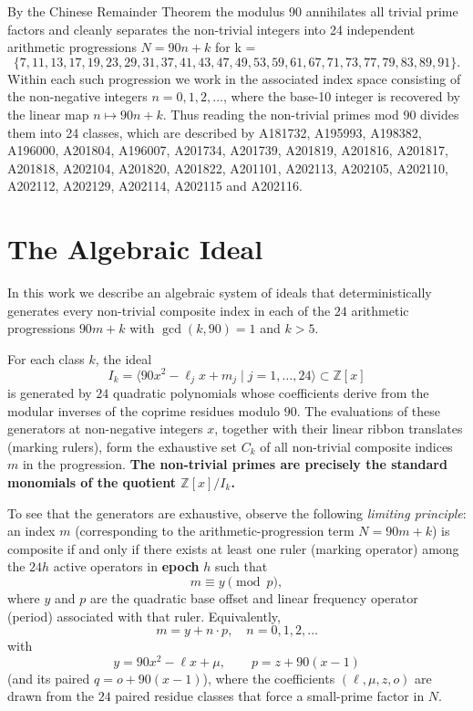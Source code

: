 \documentclass[11pt,a4paper]{article}
\begin{document}
By the Chinese Remainder Theorem the modulus 90 annihilates all trivial prime factors and cleanly separates the non-trivial integers into 24 independent arithmetic progressions \(N=90n+k\) for k = 
\[
\{7,11,13,17,19,23,29,31,37,41,43,47,49,53,59,61,67,71,73,77,79,83,89,91\}.
\]
Within each such progression we work in the associated index space consisting of the non-negative integers \(n=0,1,2,\dots\), where the base-10 integer is recovered by the linear map \(n\mapsto90n+k\). Thus reading the non-trivial primes mod 90 divides them into 24 classes, which are described by A181732, A195993,
A198382, A196000, A201804, A196007, A201734, A201739, A201819, A201816,
A201817, A201818, A202104, A201820, A201822, A201101, A202113, A202105,
A202110, A202112, A202129, A202114, A202115 and A202116. 




\section{The Algebraic Ideal}

In this work we describe an algebraic system of ideals that deterministically generates every non-trivial composite index in each of the $24$ arithmetic progressions $90m+k$ with $\gcd(k,90)=1$ and $k>5$.

For each class $k$, the ideal
\[
I_k=\langle 90x^2-\ell_j x+m_j\mid j=1,\dots,24\rangle\subset\mathbb{Z}[x]
\]
is generated by $24$ quadratic polynomials whose coefficients derive from the modular inverses of the coprime residues modulo $90$. The evaluations of these generators at non-negative integers $x$, together with their linear ribbon translates (marking rulers), form the exhaustive set $C_k$ of all non-trivial composite indices $m$ in the progression.\textbf{ The non-trivial primes are precisely the standard monomials of the quotient $\mathbb{Z}[x]/I_k$. }

To see that the generators are exhaustive, observe the following \emph{limiting principle}: an index $m$ (corresponding to the arithmetic-progression term $N=90m+k$) is composite if and only if there exists at least one ruler (marking operator) among the $24h$ active operators in \textbf{epoch} $h$ such that
\[
m \equiv y \pmod{p},
\]
where $y$ and $p$ are the quadratic base offset and linear frequency operator (period) associated with that ruler. Equivalently,
\[
m = y + n\cdot p, \quad n=0,1,2,\dots
\]
with
\[
y = 90x^2 - \ell x + \mu, \qquad p = z + 90(x-1)
\]
(and its paired $q = o + 90(x-1)$), where the coefficients $(\ell,\mu,z,o)$ are drawn from the $24$ paired residue classes that force a small-prime factor in $N$.
\end{document}
